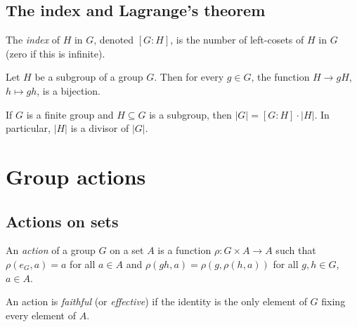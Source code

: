 \subsection{The index and Lagrange's theorem}
\label{subsec:groups:the-index-and-lagrange-s-theorem}

\begin{definition}
  \label{def:groups:index}
  \leanok
  The \emph{index} of $H$ in $G$, denoted $[G:H]$, is the number of
  left-cosets of $H$ in $G$ (zero if this is infinite).
\end{definition}

\begin{lemma}
  \label{lem:groups:coset-bijections}
  Let $H$ be a subgroup of a group $G$. Then for every $g \in G$, the
  function $H \to gH$, $h \mapsto gh$, is a bijection.
\end{lemma}

\begin{corollary}
  \label{coro:groups:lagrange}
  If $G$ is a finite group and $H \subseteq G$ is a subgroup, then
  $|G| = [G:H] \cdot |H|$. In particular, $|H|$ is a divisor of
  $|G|$.
\end{corollary}

\section{Group actions}
\label{sec:groups:group-actions}

\subsection{Actions on sets}
\label{subsec:groups:actions-on-sets}

\begin{definition}
  \label{def:groups:action-on-a-set}
  \leanok
  An \emph{action} of a group $G$ on a set $A$ is a function $\rho :
  G \times A \to A$ such that $\rho(e_G, a) = a$ for all $a \in A$
  and $\rho(gh, a) = \rho(g, \rho(h,a))$ for all $g, h \in G$, $a \in
  A$.
\end{definition}

\begin{definition}
  \label{def:groups:faithful-action}
  \leanok
  An action is \emph{faithful} (or \emph{effective}) if the identity
  is the only element of $G$ fixing every element of $A$.
\end{definition}

